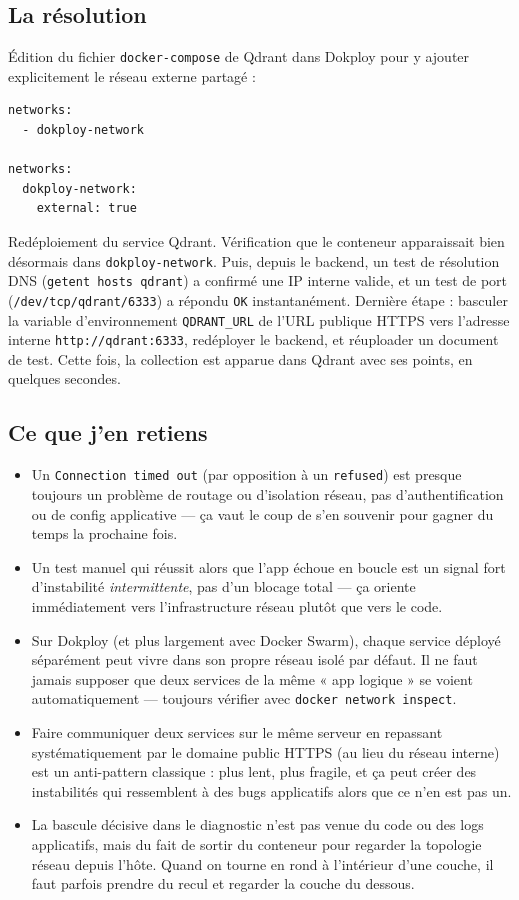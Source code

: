 \documentclass[10pt,twoside,openany]{article}
\begin{document}
\subsection*{La résolution}
Édition du fichier \texttt{docker-compose} de Qdrant dans Dokploy pour y ajouter explicitement le réseau externe partagé :

\begin{lstlisting}
networks:
  - dokploy-network

networks:
  dokploy-network:
    external: true
\end{lstlisting}

Redéploiement du service Qdrant. Vérification que le conteneur apparaissait bien désormais dans \texttt{dokploy-network}. Puis, depuis le backend, un test de résolution DNS (\texttt{getent hosts qdrant}) a confirmé une IP interne valide, et un test de port (\texttt{/dev/tcp/qdrant/6333}) a répondu \texttt{OK} instantanément. Dernière étape : basculer la variable d'environnement \texttt{QDRANT\_URL} de l'URL publique HTTPS vers l'adresse interne \texttt{http://qdrant:6333}, redéployer le backend, et réuploader un document de test. Cette fois, la collection est apparue dans Qdrant avec ses points, en quelques secondes.

\subsection*{Ce que j'en retiens}
\begin{itemize}
  \item Un \texttt{Connection timed out} (par opposition à un \texttt{refused}) est presque toujours un problème de routage ou d'isolation réseau, pas d'authentification ou de config applicative — ça vaut le coup de s'en souvenir pour gagner du temps la prochaine fois.
  \item Un test manuel qui réussit alors que l'app échoue en boucle est un signal fort d'instabilité \textit{intermittente}, pas d'un blocage total — ça oriente immédiatement vers l'infrastructure réseau plutôt que vers le code.
  \item Sur Dokploy (et plus largement avec Docker Swarm), chaque service déployé séparément peut vivre dans son propre réseau isolé par défaut. Il ne faut jamais supposer que deux services de la même « app logique » se voient automatiquement — toujours vérifier avec \texttt{docker network inspect}.
  \item Faire communiquer deux services sur le même serveur en repassant systématiquement par le domaine public HTTPS (au lieu du réseau interne) est un anti-pattern classique : plus lent, plus fragile, et ça peut créer des instabilités qui ressemblent à des bugs applicatifs alors que ce n'en est pas un.
  \item La bascule décisive dans le diagnostic n'est pas venue du code ou des logs applicatifs, mais du fait de sortir du conteneur pour regarder la topologie réseau depuis l'hôte. Quand on tourne en rond à l'intérieur d'une couche, il faut parfois prendre du recul et regarder la couche du dessous.
\end{itemize}
\end{document}

